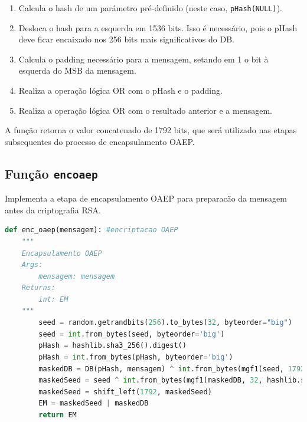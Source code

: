 \documentclass{article}
\begin{document}
    \begin{enumerate}
        \item Calcula o hash de um parámetro pré-definido (neste caso, \texttt{pHash(NULL)}).
        \item Desloca o hash para a esquerda em 1536 bits. Isso é necessário, pois o pHash deve ficar encaixado nos 256 bits mais significativos do DB.
        \item Calcula o padding necessário para a mensagem, setando em 1 o bit à esquerda do MSB da mensagem.
        \item Realiza a operação lógica OR com o pHash e o padding.
        \item Realiza a operação lógica OR com o resultado anterior e a mensagem.
    \end{enumerate}

    A função retorna o valor concatenado de 1792 bits, que será utilizado nas etapas subsequentes do processo de encapsulamento OAEP.

\vspace{4 cm}

\subsection{Função \texttt{enc\textunderscore oaep}}
Implementa a etapa de encapsulamento OAEP para preparacão da mensagem antes da criptografia RSA.

\begin{lstlisting}[language=Python]
    def enc_oaep(mensagem): #encriptacao OAEP
    """
    Encapsulamento OAEP
    Args:
        mensagem: mensagem
    Returns:
        int: EM
    """
        seed = random.getrandbits(256).to_bytes(32, byteorder="big")                                # gera uma seed aleatoria
        seed = int.from_bytes(seed, byteorder='big')                                                # converte a seed para int
        pHash = hashlib.sha3_256().digest()                                                         # hash de NULL
        pHash = int.from_bytes(pHash, byteorder='big')                                              # converte o hash da seed para int
        maskedDB = DB(pHash, mensagem) ^ int.from_bytes(mgf1(seed, 1792, hashlib.sha3_256))         # faz a concatenacao de pHash e mensagem
        maskedSeed = seed ^ int.from_bytes(mgf1(maskedDB, 32, hashlib.sha3_256))                    # faz a mascara da seed
        maskedSeed = shift_left(1792, maskedSeed)                                                   # desloca a seed para a esquerda em 1792 bits
        EM = maskedSeed | maskedDB                                                                  # concatena a mascara da seed e a mascara da mensagem
        return EM
    \end{lstlisting}
\end{document}
